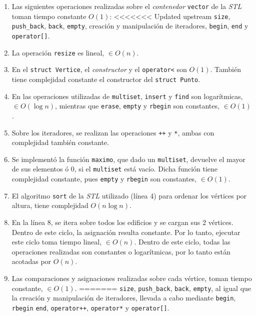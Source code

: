 \begin{enumerate}
   \item Las siguientes operaciones realizadas sobre el \textit{contenedor} \verb|vector| de la \textit{STL} toman tiempo constante $O(1)$:
<<<<<<< Updated upstream
   \verb|size|, \verb|push_back|, \verb|back|, \verb|empty|, creación y manipulación de iteradores, \verb|begin|, \verb|end|
   y \verb|operator[]|.

   \item La operación \verb|resize| es lineal, $\in O(n)$.

   \item En el \verb|struct Vertice|, el \textit{constructor} y el \verb|operator<| son $O(1)$. También
   tiene complejidad constante el constructor del \verb|struct Punto|.

   \item En las operaciones utilizadas de \verb|multiset|, \verb|insert| y \verb|find| son logarítmicas,
   $\in O(\log n)$, mientras que \verb|erase|, \verb|empty| y \verb|rbegin| son constantes, $\in O(1)$.

   \item Sobre los iteradores, se realizan las operaciones \verb|++| y \verb|*|, ambas
   con complejidad también constante.

   \item Se implementó la función \verb|maximo|, que dado un \verb|multiset|, devuelve
   el mayor de sus elementos ó 0, si el \verb|multiset| está vacío. Dicha función
   tiene complejidad constante, pues \verb|empty| y \verb|rbegin| son constantes, $\in O(1)$.

   \item El algoritmo \verb|sort| de la \textit{STL} utilizado (línea 4) para ordenar los vértices
   por altura, tiene complejidad $O(n \log n)$.

   \item En la línea 8, se itera sobre todos los edificios y se cargan sus 2 vértices. Dentro
   de este ciclo, la asignación resulta constante. Por lo tanto, ejecutar este ciclo
   toma tiempo lineal, $\in O(n)$. Dentro de este ciclo, todas las operaciones realizadas son
   constantes o logarítmicas, por lo tanto están acotadas por $O(n)$.

   \item Las comparaciones y asignaciones realizadas sobre cada vértice, toman tiempo constante,  $\in O(1)$.
=======
   \verb|size|, \verb|push_back|, \verb|back|, \verb|empty|, al igual que la
   creación y manipulación de iteradores, llevada a cabo mediante
   \verb|begin|, \verb|rbegin| \verb|end|, \verb|operator++|,
   \verb|operator*| y \verb|operator[]|.
 

\end{enumerate}
